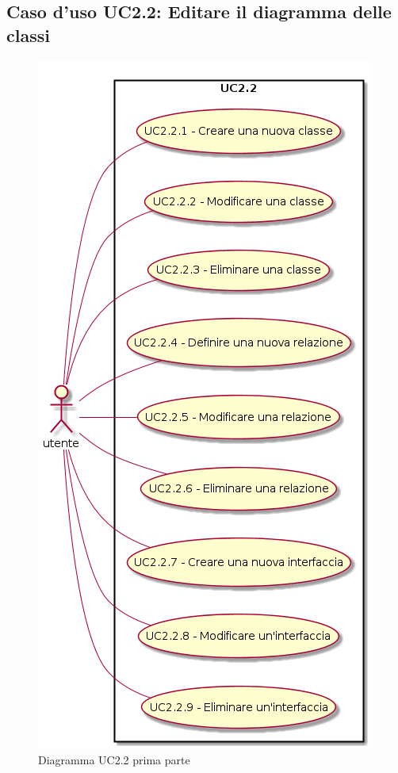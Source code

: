 \documentclass[../AnalisiDeiRequisiti.tex]{subfiles}
\begin{document}
	\subsection{Caso d'uso UC2.2: Editare il diagramma delle classi}
	\begin{figure} [H]
		\centering
		\includegraphics[scale=0.45]{./Figures/UC2.2a.png}
		\caption{Diagramma UC2.2 prima parte}\label{}
	\end{figure}
\end{document}
